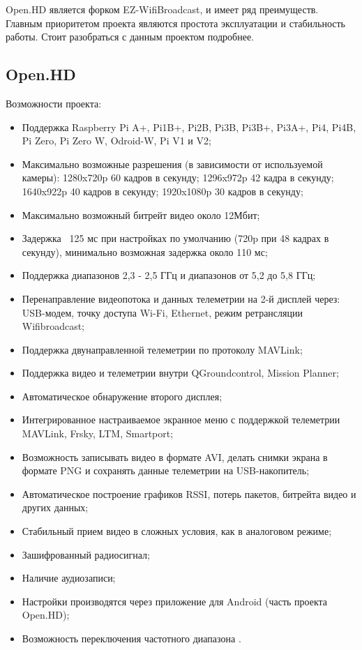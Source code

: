 Open.HD является форком EZ-WifiBroadcast, и имеет ряд преимуществ. Главным приоритетом проекта являются простота эксплуатации и стабильность работы. Стоит разобраться с данным проектом подробнее.

\subsection{Open.HD}

Возможности проекта:
\begin{itemize}
	\item Поддержка Raspberry Pi A+, Pi1B+, Pi2B, Pi3B, Pi3B+, Pi3A+, Pi4, Pi4B, Pi Zero, Pi Zero W, Odroid-W, Pi V1 и V2;
	\item Максимально возможные разрешения (в зависимости от используемой камеры): 1280x720p 60 кадров в секунду; 1296x972p 42 кадра в секунду; 1640x922p 40 кадров в секунду; 1920x1080p 30 кадров в секунду;
	\item Максимально возможный битрейт видео около 12Мбит;
	\item Задержка ~125 мс при настройках по умолчанию (720p при 48 кадрах в секунду), минимально возможная задержка около 110 мс;
	\item Поддержка диапазонов 2,3 - 2,5 ГГц и диапазонов от 5,2 до 5,8 ГГц;
	\item Перенаправление видеопотока и данных телеметрии на 2-й дисплей через: USB-модем, точку доступа Wi-Fi, Ethernet, режим ретрансляции Wifibroadcast;
	\item Поддержка двунаправленной телеметрии по протоколу MAVLink;
	\item Поддержка видео и телеметрии внутри QGroundcontrol, Mission Planner;
	\item Автоматическое обнаружение второго дисплея;
	\item Интегрированное настраиваемое экранное меню с поддержкой телеметрии MAVLink, Frsky, LTM, Smartport;
	\item Возможность записывать видео в формате AVI, делать снимки экрана в формате PNG и сохранять данные телеметрии на USB-накопитель;
	\item Автоматическое построение графиков RSSI, потерь пакетов, битрейта видео и других данных;
	\item Стабильный прием видео в сложных условия, как в аналоговом режиме;
	\item Зашифрованный радиосигнал;
	\item Наличие аудиозаписи;
	\item Настройки производятся через приложение для Android (часть проекта Open.HD);
	\item Возможность переключения частотного диапазона \cite{openhd}.
\end{itemize}

